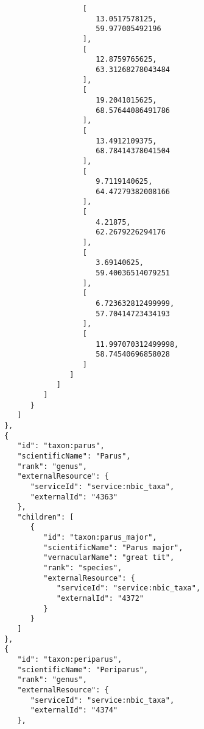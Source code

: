 \documentclass[10pt,letterpaper]{article}
\begin{document}
\begin{verbatim}
                              [
                                 13.0517578125,
                                 59.977005492196
                              ],
                              [
                                 12.8759765625,
                                 63.31268278043484
                              ],
                              [
                                 19.2041015625,
                                 68.57644086491786
                              ],
                              [
                                 13.4912109375,
                                 68.78414378041504
                              ],
                              [
                                 9.7119140625,
                                 64.47279382008166
                              ],
                              [
                                 4.21875,
                                 62.2679226294176
                              ],
                              [
                                 3.69140625,
                                 59.40036514079251
                              ],
                              [
                                 6.723632812499999,
                                 57.70414723434193
                              ],
                              [
                                 11.997070312499998,
                                 58.74540696858028
                              ]
                           ]
                        ]
                     ]
                  }
               ]
            },
            {
               "id": "taxon:parus",
               "scientificName": "Parus",
               "rank": "genus",
               "externalResource": {
                  "serviceId": "service:nbic_taxa",
                  "externalId": "4363"
               },
               "children": [
                  {
                     "id": "taxon:parus_major",
                     "scientificName": "Parus major",
                     "vernacularName": "great tit",
                     "rank": "species",
                     "externalResource": {
                        "serviceId": "service:nbic_taxa",
                        "externalId": "4372"
                     }
                  }
               ]
            },
            {
               "id": "taxon:periparus",
               "scientificName": "Periparus",
               "rank": "genus",
               "externalResource": {
                  "serviceId": "service:nbic_taxa",
                  "externalId": "4374"
               },

\end{verbatim}
\end{document}
